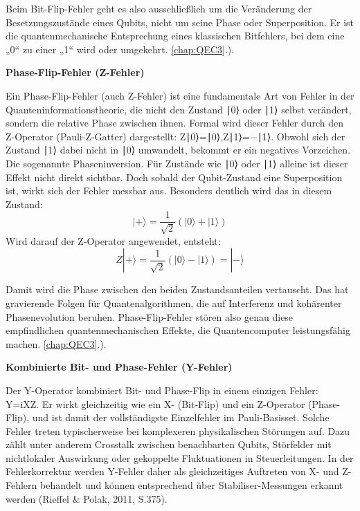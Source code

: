 Beim Bit-Flip-Fehler geht es also ausschließlich um die Veränderung der Besetzungszustände eines Qubits, nicht um seine Phase oder Superposition. Er ist die quantenmechanische Entsprechung eines klassischen Bitfehlers, bei dem eine „0“ zu einer „1“ wird oder umgekehrt. \ref{chap:QEC3}.). \cite[Seite 246-251]{rieffel_eleanor_g_and_wolfgang_h_polak_quantum_2011}



\textbf{Phase-Flip-Fehler (Z-Fehler)}

Ein Phase-Flip-Fehler (auch Z-Fehler) ist eine fundamentale Art von Fehler in der Quanteninformationstheorie, die nicht den Zustand ∣0⟩ oder ∣1⟩ selbst verändert, sondern die relative Phase zwischen ihnen. Formal wird dieser Fehler durch den Z-Operator (Pauli-Z-Gatter) dargestellt: Z∣0⟩=∣0⟩,Z∣1⟩=−∣1⟩. Obwohl sich der Zustand ∣1⟩ dabei nicht in ∣0⟩ umwandelt, bekommt er ein negatives Vorzeichen. Die sogenannte Phaseninversion. Für Zustände wie ∣0⟩ oder ∣1⟩ alleine ist dieser Effekt nicht direkt sichtbar. Doch sobald der Qubit-Zustand eine Superposition ist, wirkt sich der Fehler messbar aus. Besonders deutlich wird das in diesem Zustand: \[
|+\rangle = \frac{1}{\sqrt{2}}(|0\rangle + |1\rangle)
\]
Wird darauf der Z-Operator angewendet, entsteht:
\[
Z|+\rangle = \frac{1}{\sqrt{2}}(|0\rangle - |1\rangle) = |-\rangle
\]

Damit wird die Phase zwischen den beiden Zustandsanteilen vertauscht. Das hat gravierende Folgen für Quantenalgorithmen, die auf Interferenz und kohärenter Phasenevolution beruhen. Phase-Flip-Fehler stören also genau diese empfindlichen quantenmechanischen Effekte, die Quantencomputer leistungsfähig machen. \ref{chap:QEC3}.). \cite[Seite 251-252]{rieffel_eleanor_g_and_wolfgang_h_polak_quantum_2011}


\textbf{Kombinierte Bit- und Phase-Fehler (Y-Fehler)}

Der Y-Operator kombiniert Bit- und Phase-Flip in einem einzigen Fehler: Y=iXZ. Er wirkt gleichzeitig wie ein X- (Bit-Flip) und ein Z-Operator (Phase-Flip), und ist damit der vollständigste Einzelfehler im Pauli-Basisset. Solche Fehler treten typischerweise bei komplexeren physikalischen Störungen auf. Dazu zählt unter anderem Crosstalk zwischen benachbarten Qubits, Störfelder mit nichtlokaler Auswirkung oder gekoppelte Fluktuationen in Steuerleitungen. In der Fehlerkorrektur werden Y-Fehler daher als gleichzeitiges Auftreten von X- und Z-Fehlern behandelt und können entsprechend über Stabiliser-Messungen erkannt werden (Rieffel & Polak, 2011, S.375).

